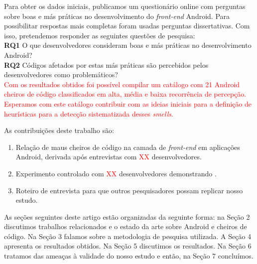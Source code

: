 Para obter os dados iniciais, publicamos um question\'ario online com perguntas sobre boas e m\'as pr\'aticas no desenvolvimento do \textit{front-end} Android. Para possibilitar respostas mais completas foram usadas perguntas dissertativas. Com isso, pretendemos responder as seguintes quest\~oes de pesquisa: \\

\textbf{RQ1} O que desenvolvedores consideram boas e m\'as pr\'aticas no desenvolvimento Android? \\

\textbf{RQ2} C\'odigos afetados por estas m\'as pr\'aticas s\~ao percebidos pelos desenvolvedores como problem\'aticos? \\

 \textcolor{red}{Com os resultados obtidos foi poss\'ivel compilar um cat\'alogo com 21 Android cheiros de c\'odigo classificados em alta, m\'edia e baixa recorr\^encia de percep\c{c}\~ao. Esperamos com este cat\'alogo contribuir com as ideias iniciais para a defini\c{c}\~ao de heur\'isticas para a detec\c{c}\~ao sistematizada desses \textit{smells}.}

As contribuições deste trabalho são:

\begin{enumerate}

	\item Relação de maus cheiros de código na camada
	de \textit{front-end} em aplicações Android, derivada após
	entrevistas com \textcolor{red}{XX} desenvolvedores.

	\item Experimento controlado com \textcolor{red}{XX} 
	desenvolvedores demonstrando \textcolor{bla bla bla}.

	\item Roteiro de entrevista para que outros pesquisadores
	possam replicar nosso estudo.
\end{enumerate}

As se\c{c}\~oes seguintes deste artigo est\~ao organizadas da seguinte forma: na Se\c{c}\~ao 2 discutimos trabalhos relacionados e o estado da arte sobre Android e cheiros de c\'odigo. Na Se\c{c}\~ao 3 falamos sobre a metodologia de pesquisa utilizada. A Se\c{c}\~ao 4 apresenta os resultados obtidos. Na Se\c{c}\~ao 5 discutimos os resultados. Na Se\c{c}\~ao 6 tratamos das amea\c{c}as \`a validade do nosso estudo e ent\~ao, na Se\c{c}\~ao 7 conclu\'imos.
